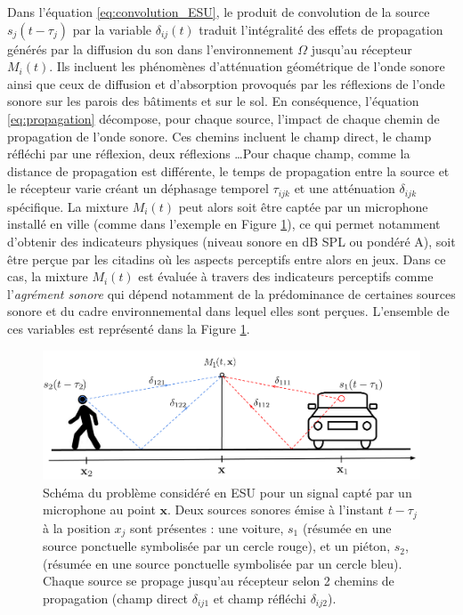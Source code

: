 Dans l'équation \ref{eq:convolution_ESU}, le produit de convolution de la source $s_j(t-\tau_j)$ par la variable $\delta_{ij}(t)$ traduit l'intégralité des effets de propagation générés par la diffusion du son dans l'environnement $\Omega$ jusqu'au récepteur $M_i(t)$. Ils incluent les phénomènes d'atténuation géométrique de l'onde sonore ainsi que ceux de diffusion et d'absorption provoqués par les réflexions de l'onde sonore sur les parois des bâtiments et sur le sol.
En conséquence, l'équation \ref{eq:propagation} décompose, pour chaque source, l'impact de chaque chemin de propagation de l'onde sonore. Ces chemins incluent le champ direct, le champ réfléchi par une réflexion, deux réflexions \dots Pour chaque champ, comme la distance de propagation est différente, le temps de propagation entre la source et le récepteur varie créant un déphasage temporel $\tau_{ijk}$ et une atténuation $\delta_{ijk}$ spécifique.
La mixture $M_{i}(t)$ peut alors soit être captée par un microphone installé en ville (comme dans l'exemple en Figure \ref{fig:schema_ville}), ce qui permet notamment d'obtenir des indicateurs physiques (niveau sonore en dB SPL ou pondéré A), soit être perçue par les citadins où les aspects perceptifs entre alors en jeux. Dans ce cas, la mixture $M_{i}(t)$ est évaluée à travers des indicateurs perceptifs comme l'\textit{agrément sonore} qui dépend notamment de la prédominance de certaines sources sonore et du cadre environnemental dans lequel elles sont perçues. L'ensemble de ces variables est représenté dans la Figure \ref{fig:schema_ville}.

\begin{figure}[hbtp]
\centering
\includegraphics[width=.9\linewidth]{./figures/autres/schema_ville_propa.pdf}
\caption{Schéma du problème considéré en ESU pour un signal capté par un microphone au point $\mathbf{x}$. Deux sources sonores émise à l'instant $t-\tau_{j}$ à la position $x_j$ sont présentes : une voiture, $s_{1}$ (résumée en une source ponctuelle symbolisée par un cercle rouge), et un piéton, $s_2$, (résumée en une source ponctuelle symbolisée par un cercle bleu). Chaque source se propage jusqu'au récepteur selon 2 chemins de propagation (champ direct $\delta_{ij1}$ et champ réfléchi $\delta_{ij2}$).}
\label{fig:schema_ville}
\end{figure}

